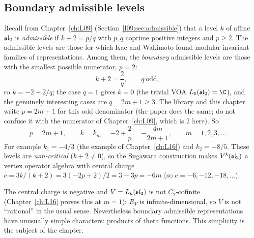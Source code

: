 \subsection{Boundary admissible levels}

Recall from Chapter~\ref{ch:L09} (Section~\ref{l09:sec:admissible}) that a level $k$ of affine $\mathfrak{sl}_2$
is \emph{admissible} if $k+2=p/q$ with $p,q$ coprime positive integers and $p\ge2$. The admissible levels
are those for which Kac and Wakimoto found modular-invariant families of representations. Among them, the
\emph{boundary} admissible levels are those with the smallest possible numerator, $p=2$:
\begin{equation*}
k+2=\frac{2}{q},\qquad q\ \text{odd},
\end{equation*}
so $k=-2+2/q$; the case $q=1$ gives $k=0$ (the trivial VOA $L_0(\ltwentysl)=\C$), and the genuinely
interesting cases are $q=2m+1\ge3$. The library and this chapter write $p=2m+1$ for this odd denominator
(the paper does the same; do not confuse it with the numerator of Chapter~\ref{ch:L09}, which is $2$ here).
So
\begin{equation*}
p=2m+1,\qquad k=k_m=-2+\frac{2}{p}=-\frac{4m}{2m+1},\qquad m=1,2,3,\dots
\end{equation*}
For example $k_1=-4/3$ (the example of Chapter~\ref{ch:L16}) and $k_2=-8/5$. These levels are
\emph{non-critical} ($k+2\neq0$), so the Sugawara construction makes $V^k(\mathfrak{sl}_2)$ a vertex operator
algebra with central charge $c=3k/(k+2)=3(-2p+2)/2=3-3p=-6m$ (so $c=-6,-12,-18,\dots$).

The central charge is negative and $V=L_k(\mathfrak{sl}_2)$ is not $C_2$-cofinite (Chapter~\ref{ch:L16}
proves this at $m=1$): $R_V$ is infinite-dimensional, so $V$ is not ``rational'' in the usual sense.
Nevertheless boundary admissible representations have unusually simple characters: products of theta
functions. This simplicity is the subject of the chapter.

